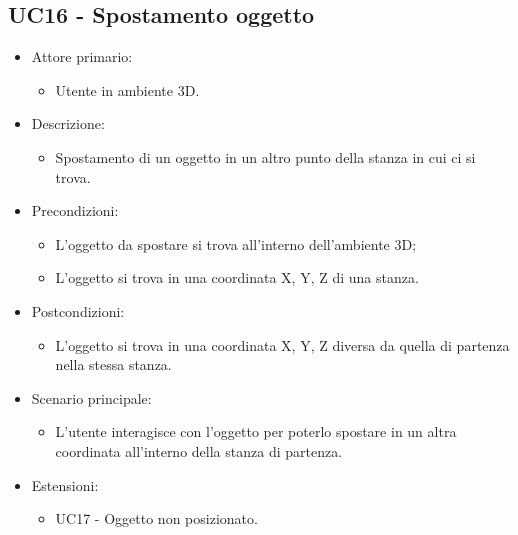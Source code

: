 \subsection{UC16 - Spostamento oggetto}
\begin{itemize}

	\item Attore primario: 
	\begin{itemize}
		\item Utente in ambiente 3D.
	\end{itemize}
	\item Descrizione:
	\begin{itemize}
		\item Spostamento di un oggetto in un altro punto della stanza in cui ci si trova.
	\end{itemize}
	
	\item Precondizioni:
	\begin{itemize}
		\item L'oggetto da spostare si trova all'interno dell'ambiente 3D;
		\item L'oggetto si trova in una coordinata X, Y, Z di una stanza.
	\end{itemize}
	
	\item Postcondizioni:
	\begin{itemize}
		\item L'oggetto si trova in una coordinata X, Y, Z diversa da quella di partenza nella stessa stanza.
	\end{itemize}
	
	\item Scenario principale:
	\begin{itemize}
		\item L'utente interagisce con l'oggetto per poterlo spostare in un altra coordinata all'interno della stanza di partenza.
	\end{itemize}
	
	\item Estensioni:
	\begin{itemize}
		\item UC17 - Oggetto non posizionato.
	\end{itemize}
	
\end{itemize}

\pagebreak

